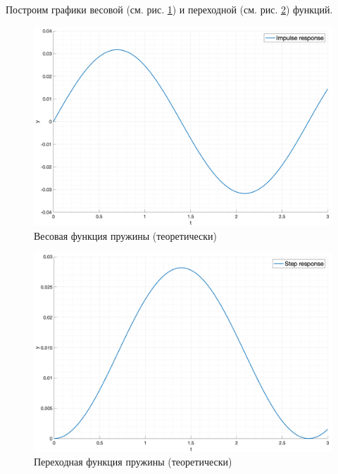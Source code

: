Построим графики весовой (см. рис. \ref{fig:task4_impulse_response_eq}) и переходной (см. рис. \ref{fig:task4_step_response_eq}) функций.
\begin{figure}[ht!]
    \centering
    \includegraphics[width=\textwidth]{media/plots/task4_impulse_response_eq.png}
    \caption{Весовая функция пружины (теоретически)}
    \label{fig:task4_impulse_response_eq}
\end{figure}
\begin{figure}[ht!]
    \centering
    \includegraphics[width=\textwidth]{media/plots/task4_step_response_eq.png}
    \caption{Переходная функция пружины (теоретически)}
    \label{fig:task4_step_response_eq}
\end{figure}

